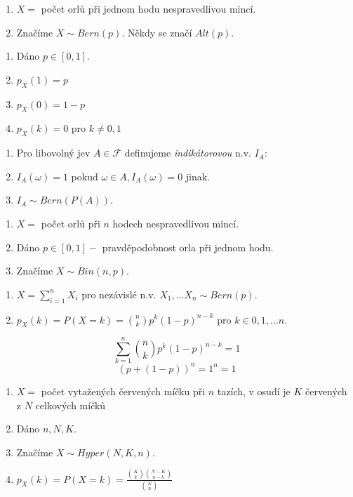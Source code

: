 \documentclass[../main.tex]{subfiles}
\begin{document}
\begin{definition}

    \begin{enumerate}
        \item $X = $ počet orlů při jednom hodu nespravedlivou mincí.
        \item Značíme $X \sim Bern(p)$. Někdy se značí $Alt(p)$.
    \end{enumerate}

    \begin{enumerate}
        \item Dáno $p \in [0,1]$.
        \item $p_X(1)=p$
        \item $p_X(0) = 1 - p$
        \item $p_X(k) = 0$ pro $k \neq 0,1$
    \end{enumerate}

    \begin{enumerate}
        \item Pro libovolný jev $A \in \mathcal{F}$ definujeme \textit{indikátorovou} n.v. $I_A$:
        \item $I_A(\omega) = 1$ pokud $\omega \in A, I_A(\omega) = 0$ jinak.
        \item $I_A \sim  Bern(P(A))$.
    \end{enumerate}
\end{definition}

\begin{definition}
    \begin{enumerate}
        \item $X = $ počet orlů při $n$ hodech nespravedlivou mincí.
        \item Dáno $p \in [0,1] - $ pravděpodobnost orla při jednom hodu.
        \item Značíme $X \sim Bin(n,p)$. 
    \end{enumerate}
    \begin{enumerate}
        \item $X = \sum^n_{i=1}X_i$ pro nezávislé n.v. $X_1,\dots X_n \sim Bern(p)$.
        \item $p_X(k) = P(X = k) = \binom{n}{k}p^k(1-p)^{n-k}$ pro $k\in {0,1,\dots n}$.
    \end{enumerate}
    \[\sum^n_{k=1}\binom{n}{k}p^k(1-p)^{n-k} = 1\]
    \[(p + (1-p))^n = 1^n = 1\]
\end{definition}

\begin{definition}

    \begin{enumerate}
        \item $X = $ počet vytažených červených míčku při $n$ tazích, v osudí je 
        $K$ červených z $N$ celkových míčků
        \item Dáno $n,N,K$.
        \item Značíme $X \sim Hyper(N,K,n)$.
        \item $p_X(k) = P(X = k) = \frac{\binom{K}{k}\binom{N-K}{n-k}}{\binom{N}{n}}$
    \end{enumerate}
\end{definition}
\end{document}
